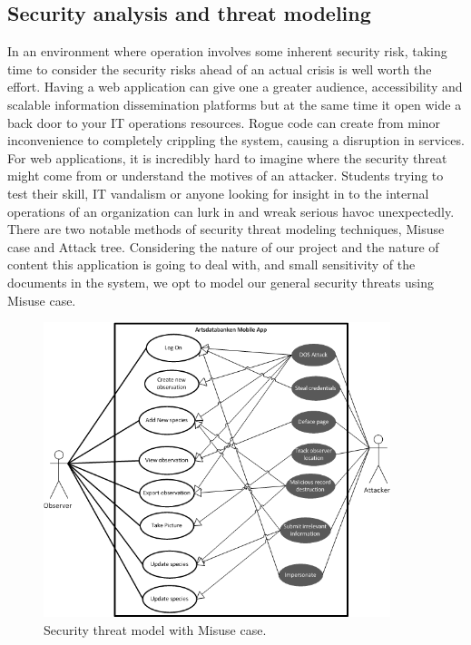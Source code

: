 \subsection{Security analysis and threat modeling}
In an environment where operation involves some inherent security risk, taking time to consider the security risks ahead of an actual crisis is well worth the effort. Having a web application can give one a greater audience, accessibility and scalable information dissemination platforms but at the same time it open wide a back door to your IT operations resources. Rogue code can create from minor inconvenience to completely crippling the system, causing a disruption in services. For web applications, it is incredibly hard to imagine where the security threat might come from or understand the motives of an attacker. Students trying to test their skill, IT vandalism or anyone looking for insight in to the internal operations of an organization can lurk in and wreak serious havoc unexpectedly.
\\[0.5cm]
There are two notable methods of security threat modeling techniques, Misuse case and Attack tree. Considering the nature of our project and the nature of content this application is going to deal with, and small sensitivity of the documents in the system, we opt to model our general security threats using Misuse case.
\begin{figure}[htb]
	\centering
    \includegraphics[width=0.9\textwidth]{reqspec/misusecase.png}
	\caption{Security threat model with Misuse case.}
	\label{fig:misusecase}
\end{figure}

